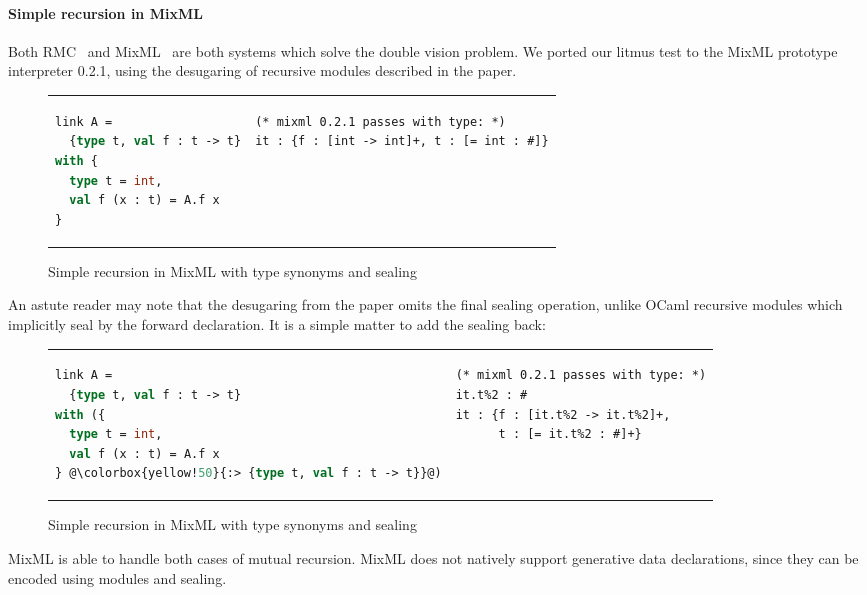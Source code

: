 \paragraph{Simple recursion in MixML}
Both RMC~\cite{dreyer:recursive} and MixML~\cite{rossberg+:mixml} are
both systems which solve the double vision problem.  We ported our
litmus test to the MixML prototype interpreter 0.2.1, using the
desugaring of recursive modules described in the paper.

\begin{figure}[H]
\begin{tabular}{p{} p{}}
\begin{lstlisting}[language=ML,escapechar=@]
link A =
  {type t, val f : t -> t}
with {
  type t = int,
  val f (x : t) = A.f x
}
\end{lstlisting}
&
\begin{verbatim}
(* mixml 0.2.1 passes with type: *)
it : {f : [int -> int]+, t : [= int : #]}
\end{verbatim}
\end{tabular}
\caption{Simple recursion in MixML with type synonyms and sealing}
\label{fig:double-vision-simple-recursion-mixml}
\end{figure}

\noindent
An astute reader may note that the desugaring from the paper omits the
final sealing operation, unlike OCaml recursive modules which implicitly
seal by the forward declaration.  It is a simple matter to add the sealing back:

\begin{figure}[H]
\begin{tabular}{p{} p{}}
\begin{lstlisting}[language=ML,escapechar=@]
link A =
  {type t, val f : t -> t}
with ({
  type t = int,
  val f (x : t) = A.f x
} @\colorbox{yellow!50}{:> {type t, val f : t -> t}}@)
\end{lstlisting}
&
\begin{verbatim}
(* mixml 0.2.1 passes with type: *)
it.t%2 : #
it : {f : [it.t%2 -> it.t%2]+,
      t : [= it.t%2 : #]+}
\end{verbatim}
\end{tabular}
\caption{Simple recursion in MixML with type synonyms and sealing}
\label{fig:double-vision-simple-recursion-mixml-sealed}
\end{figure}

\noindent
MixML is able to handle both cases of mutual recursion.  MixML does not
natively support generative data declarations, since they can be encoded
using modules and sealing.

